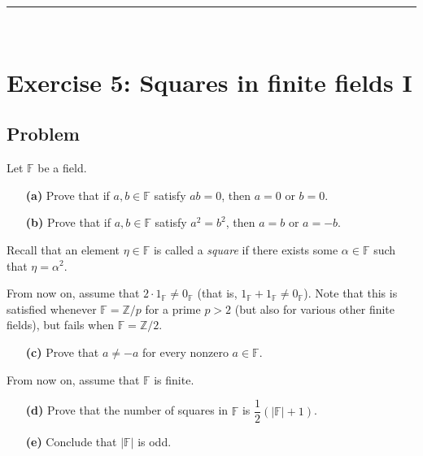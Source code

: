 \documentclass[paper=a4, fontsize=12pt]{scrartcl}%
\theoremstyle{plainsl}
\theoremstyle{definition}
\theoremstyle{remark}
\begin{document}
\rule{\linewidth}{0.3pt} \\[0.4cm]

\section{Exercise 5: Squares in finite fields I}

\subsection{Problem}

Let $\mathbb{F}$ be a field.

\begin{enumerate}
\item[\textbf{(a)}] Prove that if $a, b \in\mathbb{F}$ satisfy $ab = 0$, then
$a = 0$ or $b = 0$.

\item[\textbf{(b)}] Prove that if $a, b \in\mathbb{F}$ satisfy $a^{2} = b^{2}%
$, then $a = b$ or $a = -b$.
\end{enumerate}

Recall that an element $\eta\in\mathbb{F}$ is called a \textit{square} if
there exists some $\alpha\in\mathbb{F}$ such that $\eta= \alpha^{2}$.

From now on, assume that $2 \cdot1_{\mathbb{F}} \neq0_{\mathbb{F}}$ (that is,
$1_{\mathbb{F}} + 1_{\mathbb{F}} \neq0_{\mathbb{F}}$). Note that this is
satisfied whenever $\mathbb{F} = \mathbb{Z} / p$ for a prime $p > 2$ (but also
for various other finite fields), but fails when $\mathbb{F} = \mathbb{Z} / 2$.

\begin{enumerate}
\item[\textbf{(c)}] Prove that $a \neq-a$ for every nonzero $a \in\mathbb{F}$.
\end{enumerate}

From now on, assume that $\mathbb{F}$ is finite.

\begin{enumerate}
\item[\textbf{(d)}] Prove that the number of squares in $\mathbb{F}$ is
$\dfrac{1}{2} \left(  \left|  \mathbb{F} \right|  + 1 \right)  $.

\item[\textbf{(e)}] Conclude that $\left|  \mathbb{F} \right|  $ is odd.
\end{enumerate}
\end{document}
